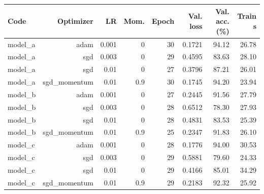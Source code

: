 \begin{tabular}{lrrrrrrr}
\toprule
Code & Optimizer & LR & Mom. & Epoch & Val. loss & Val. acc. (\%) & Train s \\
\midrule
model\_a & adam & 0.001 & 0 & 30 & 0.1721 & 94.12 & 26.78 \\
model\_a & sgd & 0.003 & 0 & 29 & 0.4595 & 83.63 & 28.10 \\
model\_a & sgd & 0.01 & 0 & 27 & 0.3796 & 87.21 & 26.01 \\
model\_a & sgd\_momentum & 0.01 & 0.9 & 30 & 0.1745 & 94.20 & 23.94 \\
model\_b & adam & 0.001 & 0 & 27 & 0.2445 & 91.56 & 27.79 \\
model\_b & sgd & 0.003 & 0 & 28 & 0.6512 & 78.30 & 27.93 \\
model\_b & sgd & 0.01 & 0 & 28 & 0.4831 & 83.53 & 25.39 \\
model\_b & sgd\_momentum & 0.01 & 0.9 & 25 & 0.2347 & 91.83 & 26.10 \\
model\_c & adam & 0.001 & 0 & 28 & 0.1776 & 94.00 & 30.53 \\
model\_c & sgd & 0.003 & 0 & 29 & 0.5881 & 79.60 & 24.33 \\
model\_c & sgd & 0.01 & 0 & 29 & 0.4166 & 85.01 & 34.29 \\
model\_c & sgd\_momentum & 0.01 & 0.9 & 29 & 0.2183 & 92.32 & 25.92 \\
\bottomrule
\end{tabular}
